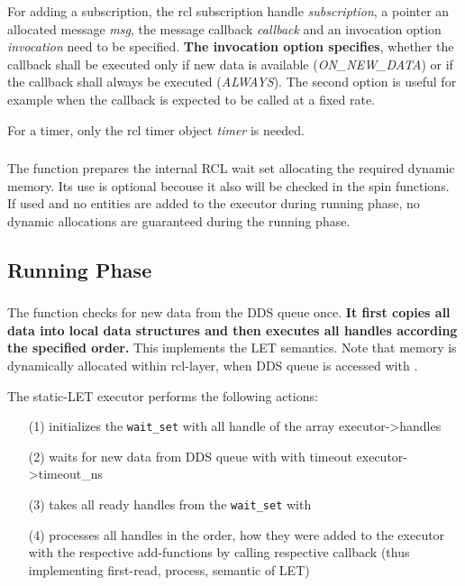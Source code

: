 For adding a subscription, the rcl subscription handle \textit{subscription}, a pointer an allocated message \textit{msg}, the message callback \textit{callback} and an invocation option \textit{invocation} need to be specified. \textbf{The invocation option specifies}, whether the callback shall be executed only if new data is available (\textit{ON\_NEW\_DATA}) or if the callback shall always be executed (\textit{ALWAYS}). The second option is useful for example when the callback is expected to be called at a fixed rate.

For a timer, only the rcl timer object \textit{timer} is needed.

\subsubsection{}
The function  prepares the internal RCL wait set allocating the required dynamic memory. Its use is optional becouse it also will be checked in the spin functions. If used and no entities are added to the executor during running phase, no dynamic allocations are guaranteed during the running phase.

\subsection{Running Phase}
\subsubsection{}
The function  checks for new data from the DDS queue once. \textbf{It first copies all data into local data structures and then executes all handles according the specified order.} This implements the LET semantics. Note that memory is dynamically allocated within rcl-layer, when DDS queue is accessed with .

The static-LET executor performs the following actions:
\begin{itemize}
    \item [(1)] initializes the \texttt{wait\_set} with all handle of the array executor->handles
    \item [(2)] waits for new data from DDS queue with  with timeout executor->timeout\_ns
    \item [(3)] takes all ready handles from the \texttt{wait\_set} with 
    \item [(4)] processes all handles in the order, how they were added to the executor with the respective add-functions by calling respective callback (thus implementing first-read, process, semantic of LET)
\end{itemize}

